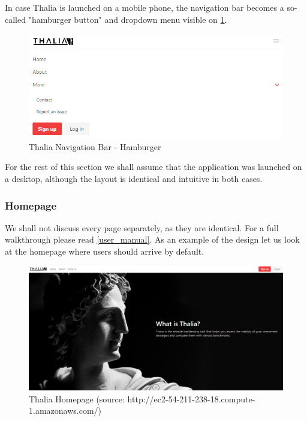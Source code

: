 \documentclass[main.tex]{subfiles}
\begin{document}
In case Thalia is launched on a mobile phone, the navigation bar becomes a so-called "hamburger button" and dropdown menu visible on \figurename{\ref{thalia_navbar_hamburger}}.

\begin{figure}[H]
   \centering
   \includegraphics[width=\textwidth]{08Appendices/081User/081Pictures/navbar_hamburger.png}
   \caption{Thalia Navigation Bar - Hamburger}
   \label{thalia_navbar_hamburger}
\end{figure}

For the rest of this section we shall assume that the application was launched on a desktop, although the layout is identical and intuitive in both cases. 

\subsubsection*{Homepage}

We shall not discuss every page separately, as they are identical. For a full walkthrough please read \ref{user_manual}. As an example of the design let us look at the homepage where users should arrive by default.

\begin{figure}[H]
   \centering
   \includegraphics[width=\textwidth]{08Appendices/081User/081Pictures/homepage.png}
   \caption{Thalia Homepage (source: http://ec2-54-211-238-18.compute-1.amazonaws.com/)}
   \label{thalia_home}
\end{figure}
\end{document}
